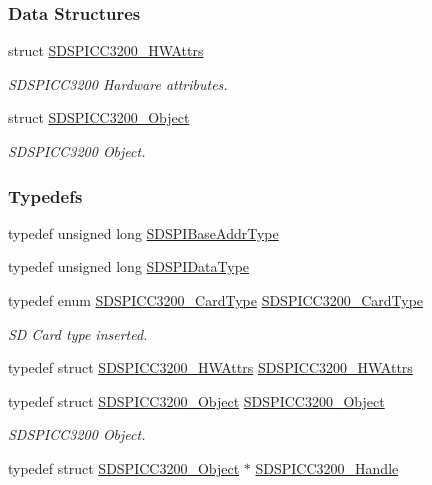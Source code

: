 \subsubsection*{Data Structures}
\begin{DoxyCompactItemize}
\item 
struct \hyperlink{struct_s_d_s_p_i_c_c3200___h_w_attrs}{S\+D\+S\+P\+I\+C\+C3200\+\_\+\+H\+W\+Attrs}
\begin{DoxyCompactList}\small\item\em S\+D\+S\+P\+I\+C\+C3200 Hardware attributes. \end{DoxyCompactList}\item 
struct \hyperlink{struct_s_d_s_p_i_c_c3200___object}{S\+D\+S\+P\+I\+C\+C3200\+\_\+\+Object}
\begin{DoxyCompactList}\small\item\em S\+D\+S\+P\+I\+C\+C3200 Object. \end{DoxyCompactList}\end{DoxyCompactItemize}
\subsubsection*{Typedefs}
\begin{DoxyCompactItemize}
\item 
typedef unsigned long \hyperlink{_s_d_s_p_i_c_c3200_8h_ad2ee2f6fbdb79c0577161ae92a7f1650}{S\+D\+S\+P\+I\+Base\+Addr\+Type}
\item 
typedef unsigned long \hyperlink{_s_d_s_p_i_c_c3200_8h_ae10295fbeb91d6f844cc3694462f6a4b}{S\+D\+S\+P\+I\+Data\+Type}
\item 
typedef enum \hyperlink{_s_d_s_p_i_c_c3200_8h_aef9c37db8744ba414b93ef56c1473be7}{S\+D\+S\+P\+I\+C\+C3200\+\_\+\+Card\+Type} \hyperlink{_s_d_s_p_i_c_c3200_8h_aeef94f747a3b3759b7220d3c78881d05}{S\+D\+S\+P\+I\+C\+C3200\+\_\+\+Card\+Type}
\begin{DoxyCompactList}\small\item\em S\+D Card type inserted. \end{DoxyCompactList}\item 
typedef struct \hyperlink{struct_s_d_s_p_i_c_c3200___h_w_attrs}{S\+D\+S\+P\+I\+C\+C3200\+\_\+\+H\+W\+Attrs} \hyperlink{_s_d_s_p_i_c_c3200_8h_a49c29170776eca52c0d66c231a3736e3}{S\+D\+S\+P\+I\+C\+C3200\+\_\+\+H\+W\+Attrs}
\item 
typedef struct \hyperlink{struct_s_d_s_p_i_c_c3200___object}{S\+D\+S\+P\+I\+C\+C3200\+\_\+\+Object} \hyperlink{_s_d_s_p_i_c_c3200_8h_ac7c8f2ad346149f283d5a267a16feee7}{S\+D\+S\+P\+I\+C\+C3200\+\_\+\+Object}
\begin{DoxyCompactList}\small\item\em S\+D\+S\+P\+I\+C\+C3200 Object. \end{DoxyCompactList}\item 
typedef struct \hyperlink{struct_s_d_s_p_i_c_c3200___object}{S\+D\+S\+P\+I\+C\+C3200\+\_\+\+Object} $\ast$ \hyperlink{_s_d_s_p_i_c_c3200_8h_a5b5f40039814acdfe2a666c59a845596}{S\+D\+S\+P\+I\+C\+C3200\+\_\+\+Handle}
\end{DoxyCompactItemize}
